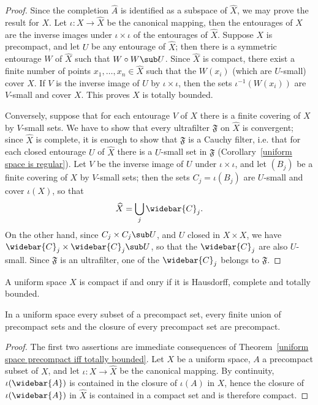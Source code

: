 \begin{proof}
Since the completion $\widehat{A}$ is identified as a subspace of $\widehat{X}$, we may prove the result for $X$. Let $\iota:X\to\widehat{X}$ be the canonical mapping, then the entourages of $X$ are the inverse images under $\iota\times\iota$ of the entourages of $\widehat{X}$. Suppose $X$ is precompact, and let $U$ be any entourage of $\widehat{X}$; then there is a symmetric entourage $W$ of $\widehat{X}$ such that $W\circ W\sub U$. Since $\widehat{X}$ is compact, there exist a finite number of points $x_1,\dots,x_n\in\widehat{X}$ such that the $W(x_i)$ (which are $U$-small) cover $X$. If $V$ is the inverse image of $U$ by $\iota\times\iota$, then the sets $\iota^{-1}(W(x_i))$ are $V$-small and cover $X$. This proves $X$ is totally bounded.\par
Conversely, suppose that for each entourage $V$ of $X$ there is a finite covering of $X$ by $V$-small sets. We have to show that every ultrafilter $\mathfrak{F}$ on $\widehat{X}$ is convergent; since $\widehat{X}$ is complete, it is enough to show that $\mathfrak{F}$ is a Cauchy filter, i.e. that for each closed entourage $U$ of $\widehat{X}$ there is a $U$-small set in $\mathfrak{F}$ (Corollary~\ref{uniform space is regular}). Let $V$ be the inverse image of $U$ under $\iota\times\iota$, and let $(B_j)$ be a finite covering of $X$ by $V$-small sets; then the sets $C_j=\iota(B_j)$ are $U$-small and cover $\iota(X)$, so that
\[\widehat{X}=\bigcup_{j}\widebar{C}_j.\]
On the other hand, since $C_j\times C_j\sub U$, and $U$ closed in $X\times X$, we have $\widebar{C}_j\times\widebar{C}_j\sub U$, so that the $\widebar{C}_j$ are also $U$-small. Since $\mathfrak{F}$ is an ultrafilter, one of the $\widebar{C}_j$ belongs to $\mathfrak{F}$.
\end{proof}
\begin{corollary}
A uniform space $X$ is compact if and onry if it is Hausdorff, complete and totally bounded.
\end{corollary}
\begin{proposition}\label{uniform space precompact union closure}
In a uniform space every subset of a precompact set, every finite union of precompact sets and the closure of every precompact set are precompact.
\end{proposition}
\begin{proof}
The first two assertions are immediate consequences of Theorem~\ref{uniform space precompact iff totally bounded}. Let $X$ be a uniform space, $A$ a precompact subset of $X$, and let $\iota:X\to\widehat{X}$ be the canonical mapping. By continuity, $\iota(\widebar{A})$ is contained in the closure of $\iota(A)$ in $X$, hence the closure of $\iota(\widebar{A})$ in $\widehat{X}$ is contained in a compact set and is therefore compact.
\end{proof}
